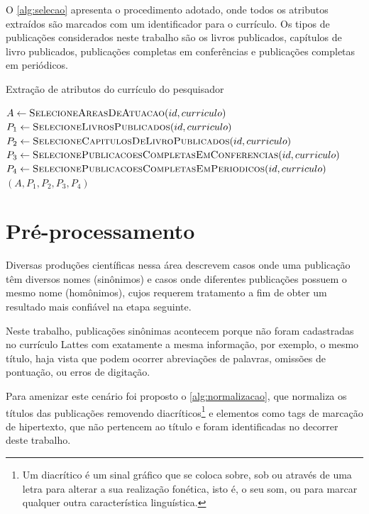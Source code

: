 O \autoref{alg:selecao} apresenta o procedimento adotado, onde todos os atributos extraídos são marcados com um identificador para o currículo. Os tipos de publicações considerados neste trabalho são os livros publicados, capítulos de livro publicados, publicações completas em conferências e publicações completas em periódicos.

\begin{algorithm}
\caption{Extração de atributos do currículo do pesquisador}
\label{alg:selecao}
\begin{algorithmic}[1]

\State $A\gets \Call{SelecioneAreasDeAtuacao}{id,curriculo}$
\State $P_1\gets \Call{SelecioneLivrosPublicados}{id,curriculo}$
\State $P_2\gets \Call{SelecioneCapitulosDeLivroPublicados}{id,curriculo}$
\State $P_3\gets \Call{SelecionePublicacoesCompletasEmConferencias}{id,curriculo}$
\State $P_4\gets \Call{SelecionePublicacoesCompletasEmPeriodicos}{id,curriculo}$
\State \Return $(A,P_1,P_2,P_3,P_4)$
\EndProcedure

\end{algorithmic}
\end{algorithm}

\section{Pré-processamento}

Diversas produções científicas nessa área \cite{franceschet2011collaboration} \cite{mena2013prospecccao} \cite{reuther2006managing} descrevem casos onde uma publicação têm diversos nomes (sinônimos) e casos onde diferentes publicações possuem o mesmo nome (homônimos), cujos requerem tratamento a fim de obter um resultado mais confiável na etapa seguinte.

Neste trabalho, publicações sinônimas acontecem porque não foram cadastradas no currículo Lattes com exatamente a mesma informação, por exemplo, o mesmo título, haja vista que podem ocorrer abreviações de palavras, omissões de pontuação, ou erros de digitação.

Para amenizar este cenário foi proposto o \autoref{alg:normalizacao}, que normaliza os títulos das publicações removendo diacríticos\footnote{Um diacrítico é um sinal gráfico que se coloca sobre, sob ou através de uma letra para alterar a sua realização fonética, isto é, o seu som, ou para marcar qualquer outra característica linguística.} e elementos como tags de marcação de hipertexto, que não pertencem ao título e foram identificadas no decorrer deste trabalho.

